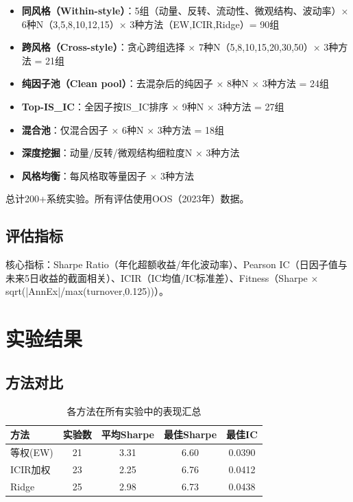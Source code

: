 \documentclass[11pt,a4paper]{ctexart}
\begin{document}
\begin{itemize}[nosep]
    \item \textbf{同风格（Within-style）}：5组（动量、反转、流动性、微观结构、波动率）× 6种N（3,5,8,10,12,15）× 3种方法（EW,ICIR,Ridge）= 90组
    \item \textbf{跨风格（Cross-style）}：贪心跨组选择 × 7种N（5,8,10,15,20,30,50）× 3种方法 = 21组
    \item \textbf{纯因子池（Clean pool）}：去混杂后的纯因子 × 8种N × 3种方法 = 24组
    \item \textbf{Top-IS\_IC}：全因子按IS\_IC排序 × 9种N × 3种方法 = 27组
    \item \textbf{混合池}：仅混合因子 × 6种N × 3种方法 = 18组
    \item \textbf{深度挖掘}：动量/反转/微观结构细粒度N × 3种方法
    \item \textbf{风格均衡}：每风格取等量因子 × 3种方法
\end{itemize}

总计200+系统实验。所有评估使用OOS（2023年）数据。

\subsection{评估指标}

核心指标：Sharpe Ratio（年化超额收益/年化波动率）、Pearson IC（日因子值与未来5日收益的截面相关）、ICIR（IC均值/IC标准差）、Fitness（Sharpe × sqrt(|AnnEx|/max(turnover,0.125))）。

\section{实验结果}

\subsection{方法对比}

\begin{table}[H]
\centering
\caption{各方法在所有实验中的表现汇总}
\begin{tabular}{lcccc}
\toprule
\textbf{方法} & \textbf{实验数} & \textbf{平均Sharpe} & \textbf{最佳Sharpe} & \textbf{最佳IC} \\
\midrule
等权(EW)  & 21 & 3.31 & 6.60 & 0.0390 \\
ICIR加权  & 23 & 2.25 & 6.76 & 0.0412 \\
Ridge     & 25 & 2.98 & 6.73 & 0.0438 \\
\bottomrule
\end{tabular}
\end{table}
\end{document}
